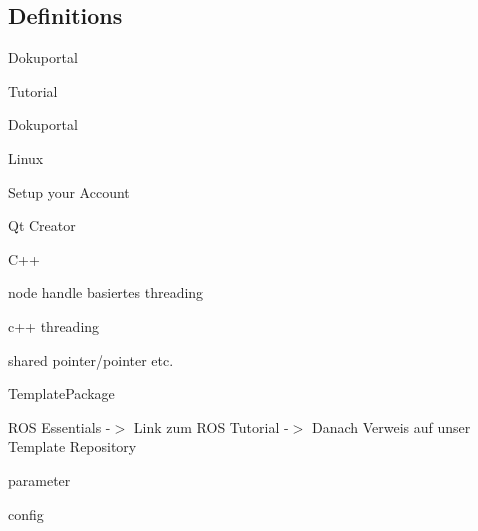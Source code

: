 \subsection*{Definitions}


\begin{DoxyEnumerate}
\item Dokuportal
\begin{DoxyEnumerate}
\item Tutorial
\begin{DoxyEnumerate}
\item Dokuportal
\end{DoxyEnumerate}
\begin{DoxyEnumerate}
\item Linux
\end{DoxyEnumerate}
\begin{DoxyEnumerate}
\item Setup your Account
\end{DoxyEnumerate}
\begin{DoxyEnumerate}
\item Qt Creator
\end{DoxyEnumerate}
\begin{DoxyEnumerate}
\item C++
\begin{DoxyEnumerate}
\item node handle basiertes threading
\end{DoxyEnumerate}
\begin{DoxyEnumerate}
\item c++ threading
\end{DoxyEnumerate}
\begin{DoxyEnumerate}
\item shared pointer/pointer etc.
\end{DoxyEnumerate}
\end{DoxyEnumerate}
\begin{DoxyEnumerate}
\item Template\+Package
\end{DoxyEnumerate}
\begin{DoxyEnumerate}
\item R\+OS Essentials -\/$>$ Link zum R\+OS Tutorial -\/$>$ Danach Verweis auf unser Template Repository
\begin{DoxyEnumerate}
\item parameter
\begin{DoxyEnumerate}
\item config
\end{DoxyEnumerate}

\end{DoxyEnumerate}
\end{DoxyEnumerate}
\end{DoxyEnumerate}
\end{DoxyEnumerate}

